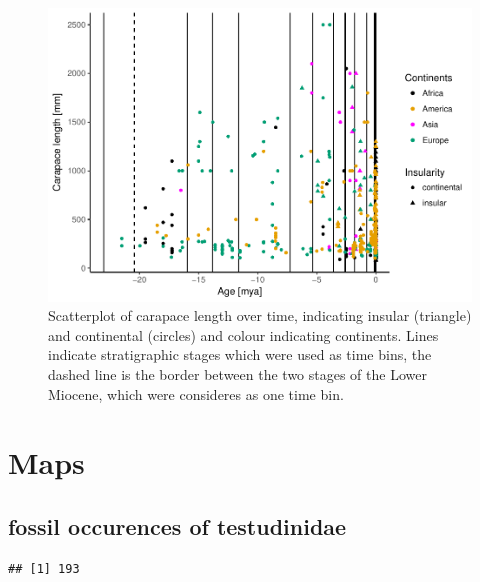 \documentclass[]{article}
\begin{document}
\begin{figure}[htbp]
\centering
\includegraphics{MA_JJ_files/figure-latex/overviewData-1.pdf}
\caption{Scatterplot of carapace length over time, indicating insular
(triangle) and continental (circles) and colour indicating continents.
Lines indicate stratigraphic stages which were used as time bins, the
dashed line is the border between the two stages of the Lower Miocene,
which were consideres as one time bin.}
\end{figure}

\newpage

\section{Maps}\label{maps}

\subsection{fossil occurences of
testudinidae}\label{fossil-occurences-of-testudinidae}

\begin{verbatim}
## [1] 193
\end{verbatim}
\end{document}
